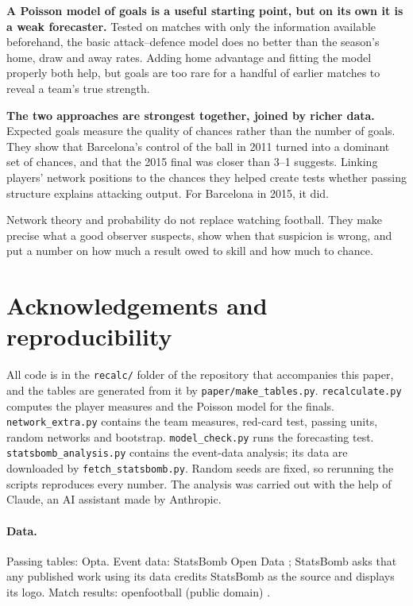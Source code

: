 \documentclass[11pt,a4paper]{article}
\begin{document}
\textbf{A Poisson model of goals is a useful starting point, but on its own it is a weak forecaster.} Tested on \nKO{} matches with only the information available beforehand, the basic attack--defence model does no better than the season's home, draw and away rates. Adding home advantage and fitting the model properly both help, but goals are too rare for a handful of earlier matches to reveal a team's true strength.

\textbf{The two approaches are strongest together, joined by richer data.} Expected goals measure the quality of chances rather than the number of goals. They show that Barcelona's control of the ball in 2011 turned into a dominant set of chances, and that the 2015 final was closer than 3--1 suggests. Linking players' network positions to the chances they helped create tests whether passing structure explains attacking output. For Barcelona in 2015, it did.

Network theory and probability do not replace watching football. They make precise what a good observer suspects, show when that suspicion is wrong, and put a number on how much a result owed to skill and how much to chance.

\section*{Acknowledgements and reproducibility}\label{sec:reproducibility}
All code is in the \texttt{recalc/} folder of the repository that accompanies this paper, and the tables are generated from it by \texttt{paper/make\_tables.py}. \texttt{recalculate.py} computes the player measures and the Poisson model for the finals. \texttt{network\_extra.py} contains the team measures, red-card test, passing units, random networks and bootstrap. \texttt{model\_check.py} runs the forecasting test. \texttt{statsbomb\_analysis.py} contains the event-data analysis; its data are downloaded by \texttt{fetch\_statsbomb.py}. Random seeds are fixed, so rerunning the scripts reproduces every number. The analysis was carried out with the help of Claude, an AI assistant made by Anthropic.

\paragraph{Data.} Passing tables: Opta. Event data: StatsBomb Open Data \cite{statsbomb}; StatsBomb asks that any published work using its data credits StatsBomb as the source and displays its logo. Match results: openfootball (public domain) \cite{openfootball}.
\end{document}
